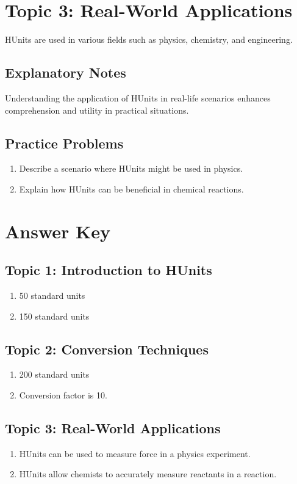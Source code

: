 \documentclass{article}
\begin{document}
\section*{Topic 3: Real-World Applications}
HUnits are used in various fields such as physics, chemistry, and engineering.

\subsection*{Explanatory Notes}
Understanding the application of HUnits in real-life scenarios enhances comprehension and utility in practical situations.

\subsection*{Practice Problems}
\begin{enumerate}[label=\alph*)]
    \item Describe a scenario where HUnits might be used in physics.
    \item Explain how HUnits can be beneficial in chemical reactions.
\end{enumerate}

\section*{Answer Key}
\subsection*{Topic 1: Introduction to HUnits}
\begin{enumerate}[label=\alph*)]
    \item 50 standard units
    \item 150 standard units
\end{enumerate}

\subsection*{Topic 2: Conversion Techniques}
\begin{enumerate}[label=\alph*)]
    \item 200 standard units
    \item Conversion factor is 10.
\end{enumerate}

\subsection*{Topic 3: Real-World Applications}
\begin{enumerate}[label=\alph*)]
    \item HUnits can be used to measure force in a physics experiment.
    \item HUnits allow chemists to accurately measure reactants in a reaction.
\end{enumerate}
\end{document}
